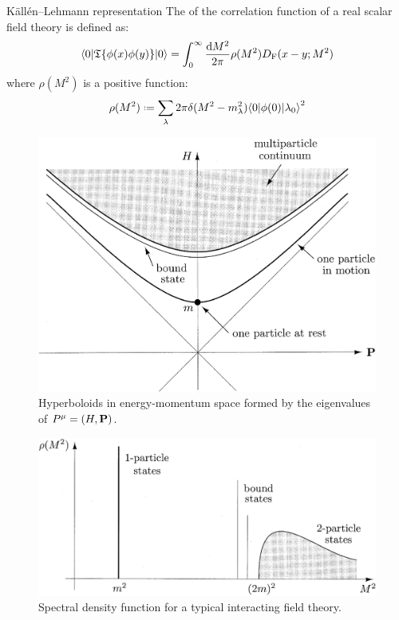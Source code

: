 \begin{definition}{Källén--Lehmann representation}{}
  The  of the correlation function of a real scalar field theory is defined as:
  \begin{equation}
    \braket{0 | \mathfrak{T}\{\phi(x) \phi(y)\} | 0} = \int_0^\infty \frac{\mathrm{d} M^2}{2\pi} \rho(M^2) D_\text{F}(x-y ; M^2)
  \end{equation}
  where $ \rho(M^2) $ is a positive  function:
  \begin{equation}
    \rho(M^2) \defeq \sum_\lambda 2\pi \delta(M^2 - m_\lambda^2) {\braket{0 | \phi(0) | \lambda_0}}^2
  \end{equation}
\end{definition}

\begin{figure}[!ht]
  \centering
  \includegraphics[width = 0.70 \textwidth]{images/mas-hyp.png}
  \caption{Hyperboloids in energy-momentum space formed by the eigenvalues of $ P^\mu = (H, \mathbf{P}) $.}
  \label{fig:mass-1}
\end{figure}

\begin{figure}[!ht]
  \centering
  \includegraphics[width = 0.60 \textwidth]{images/spec-dens.png}
  \caption{Spectral density function for a typical interacting field theory.}
  \label{fig:mass-2}
\end{figure}

